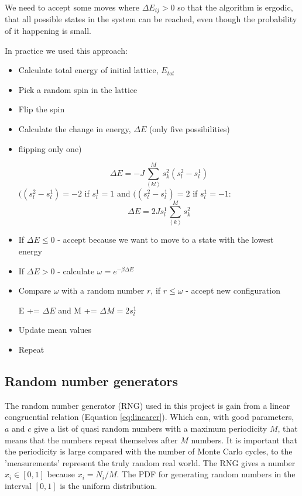 We need to accept some moves where $\Delta E_{ij} > 0$ so that the algorithm is ergodic, that all possible states in the system can be reached, even though the probability of it happening is small.

In practice we used this approach:
\begin{itemize}
\item Calculate total energy of initial lattice, $E_{tot}$

\item Pick a random spin in the lattice

\item Flip the spin

\item Calculate the change in energy, $\Delta E$ (only five possibilities)

\item flipping only one)
    
    $$ \Delta E = -J\sum_{\left<kl\right>}^M s^2_k \left( s_l^2-s_l^1\right)$$
    $(\left( s_l^2-s_l^1\right) = -2$  if $s_l^1 = 1$ and $(\left( s_l^2-s_l^1\right) = 2$  if $s_l^1 = -1$:
    $$ \Delta E = 2Js_l^1\sum_{\left<k\right>}^M s^2_k$$

\item If $\Delta E \leq 0$ - accept because we want to move to a state with the lowest energy

\item If $\Delta E > 0$ - calculate $\omega = e^{-\beta \Delta E}$

\item Compare $\omega$ with a random number $r$, if $r \leq \omega$ - accept new configuration
    
    E += $\Delta E$ and 
    M += $\Delta M = 2s_l^1$

\item Update mean values

\item Repeat  


\end{itemize}

\subsection{Random number generators}

The random number generator (RNG) used in this project is gain from a linear congruential relation (Equation \ref{eq:linearcr}). Which can, with good parameters, $a$ and $c$ give a list of quasi random numbers with a maximum periodicity $M$, that means that the numbers repeat themselves after $M$ numbers. It is important that the periodicity is large compared with the number of Monte Carlo cycles, to the 'measurements' represent the truly random real world. The RNG gives a number $x_i \in [0,1]$ because $x_i = N_i/M$. The PDF for generating random numbers in the interval $[0,1]$ is the uniform distribution.

